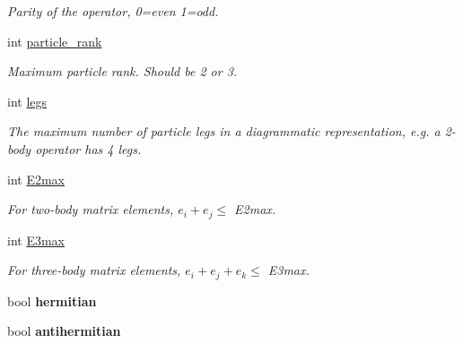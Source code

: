 \begin{DoxyCompactItemize}
\begin{DoxyCompactList}\small\item\em Parity of the operator, 0=even 1=odd. \end{DoxyCompactList}\item 
\hypertarget{classOperator_a44a74c03caff49e776433e885a724956}{int \hyperlink{classOperator_a44a74c03caff49e776433e885a724956}{particle\-\_\-rank}}\label{classOperator_a44a74c03caff49e776433e885a724956}

\begin{DoxyCompactList}\small\item\em Maximum particle rank. Should be 2 or 3. \end{DoxyCompactList}\item 
\hypertarget{classOperator_adf3f953d905e5fec163e10097d2cfbde}{int \hyperlink{classOperator_adf3f953d905e5fec163e10097d2cfbde}{legs}}\label{classOperator_adf3f953d905e5fec163e10097d2cfbde}

\begin{DoxyCompactList}\small\item\em The maximum number of particle legs in a diagrammatic representation, e.\-g. a 2-\/body operator has 4 legs. \end{DoxyCompactList}\item 
\hypertarget{classOperator_ace64ea3f299cfba00bc973e58ce03414}{int \hyperlink{classOperator_ace64ea3f299cfba00bc973e58ce03414}{E2max}}\label{classOperator_ace64ea3f299cfba00bc973e58ce03414}

\begin{DoxyCompactList}\small\item\em For two-\/body matrix elements, $ e_i + e_j \leq $ E2max. \end{DoxyCompactList}\item 
\hypertarget{classOperator_ad3ebb434f911b9cb7c54ca6990cdda8c}{int \hyperlink{classOperator_ad3ebb434f911b9cb7c54ca6990cdda8c}{E3max}}\label{classOperator_ad3ebb434f911b9cb7c54ca6990cdda8c}

\begin{DoxyCompactList}\small\item\em For three-\/body matrix elements, $ e_i + e_j + e_k \leq $ E3max. \end{DoxyCompactList}\item 
\hypertarget{classOperator_ad46a54204c51cf5c82e4c489217bd2c1}{bool {\bfseries hermitian}}\label{classOperator_ad46a54204c51cf5c82e4c489217bd2c1}

\item 
\hypertarget{classOperator_a86dd30fca215948dd9307fa45b7a2e32}{bool {\bfseries antihermitian}}\label{classOperator_a86dd30fca215948dd9307fa45b7a2e32}


\end{DoxyCompactItemize}
